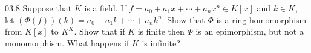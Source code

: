 \documentclass[11pt]{article}
\begin{document}
\begin{problem}{03.8}
  Suppose that $K$ is a field. If $f = a_{0} + a_{1}x + \cdots + a_{n}x^{n} \in
  K[x]$ and $k \in K$, let $(\Phi(f))(k) = a_{0} + a_{1}k + \cdots + a_{n}k^{n}$.
  Show that $\Phi$ is a ring homomorphism from $K[x]$ to $K^{K}$. Show that if
  $K$ is finite then $\Phi$ is an epimorphism, but not a monomorphism. What
  happens if $K$ is infinite?
\end{problem}
\end{document}

